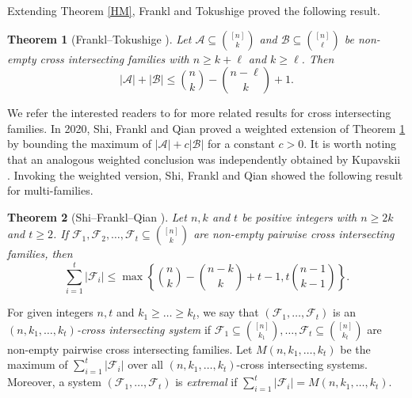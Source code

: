 \documentclass[a4paper,11pt]{article}
\newtheorem{theorem}{Theorem}[section]
\begin{document}
Extending Theorem \ref{HM},
 Frankl and Tokushige \cite{FT} proved the following result.

 \begin{theorem}[Frankl--Tokushige \cite{FT}]\label{FT1992}
Let $\mathcal{A}\subseteq {[n]\choose k}$ and $\mathcal{B}\subseteq {[n]\choose \ell}$ be non-empty cross intersecting families with $n\geq k+ \ell$ and $k\geq \ell $. Then
$$|\mathcal{A}|+|\mathcal{B}|\leq{n\choose k}-{n-\ell \choose k}+1. $$
\end{theorem}





We refer the interested readers to \cite{BF2022, Fra2024, FT1998, FW2023, FW2024-EUJC, WFL2025} for more related results for cross intersecting families.
In 2020, Shi, Frankl and Qian \cite{SFQ2020} proved a weighted extension of Theorem \ref{FT1992} by bounding the maximum of $|\mathcal{A}| + c|\mathcal{B}|$ for a constant $c>0$.
 It is worth noting that an analogous weighted conclusion was independently obtained by Kupavskii \cite{Kupavskii2018}. Invoking the weighted version, Shi, Frankl and Qian \cite{SFQ2020} showed the following result for multi-families.




  \begin{theorem}[Shi--Frankl--Qian \cite{SFQ2020}] \label{SFQ}
Let $n,k$ and $t$ be positive integers with $n\ge 2k$ and $t\ge 2$.
If $\mathcal{F}_1, \mathcal{F}_2, \ldots ,\mathcal{F}_t \subseteq {[n] \choose k}$ are non-empty pairwise cross intersecting families, then
\[ \sum_{i=1}^t |\mathcal{F}_i|  \le
\max\left\{ {n \choose k} - {n-k \choose k} + t-1, t{n-1 \choose k-1}  \right\}. \]
\end{theorem}


For given integers $n, t$ and  $k_1\geq \dots\geq k_t$,
 we say that $(\mathcal{F}_1, \dots, \mathcal{F}_t)$ is an {\it $(n, k_1, \dots, k_t)$-cross intersecting system} if  $\mathcal{F}_1\subseteq {[n]\choose k_1}, \dots, \mathcal{F}_t\subseteq {[n]\choose k_t}$ are non-empty pairwise cross intersecting families.
Let $ M(n, k_1, \dots, k_t)$ be the maximum of $\sum_{i=1}^t |\mathcal{F}_i|$ over all $(n,k_1,\ldots ,k_t)$-cross intersecting systems.
Moreover, a system $(\mathcal{F}_1, \dots, \mathcal{F}_t)$  is {\em extremal} if $\sum_{i=1}^t|\mathcal{F}_i|=M(n, k_1, \dots, k_t)$.
\end{document}
